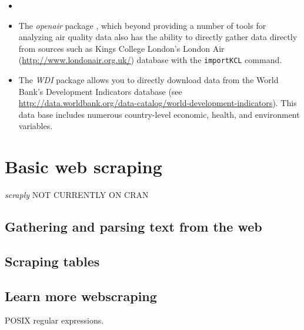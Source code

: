 \begin{itemize}
	\item {}
	\item The \emph{openair} package \cite{R-openair}, which beyond providing a number of tools for analyzing air quality data also has the ability to directly gather data directly from sources such as Kings College London's London Air (\url{http://www.londonair.org.uk/}) database with the \texttt{importKCL} command.
	\item The \emph{WDI} package \cite{R-WDI} allows you to directly download data from the World Bank's Development Indicators database (see \url{http://data.worldbank.org/data-catalog/world-development-indicators}). This data base includes numerous country-level economic, health, and environment variables. 
\end{itemize}

\section{Basic web scraping}

\emph{scraply}  NOT CURRENTLY ON CRAN



\subsection{Gathering and parsing text from the web}

\subsection{Scraping tables}

\subsection{Learn more webscraping}

POSIX regular expressions.

